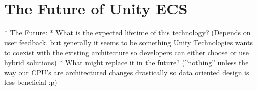 \section{The Future of Unity ECS} 
* The Future:
  * What is the expected lifetime of this technology? (Depends on user feedback, but generally it seems to be something Unity Technologies wants to coexist with the existing architecture so developers can either choose or use hybrid solutions)
  * What might replace it in the future? (''nothing'' unless the way our CPU's are architectured changes drastically so data oriented design is less beneficial :p)
